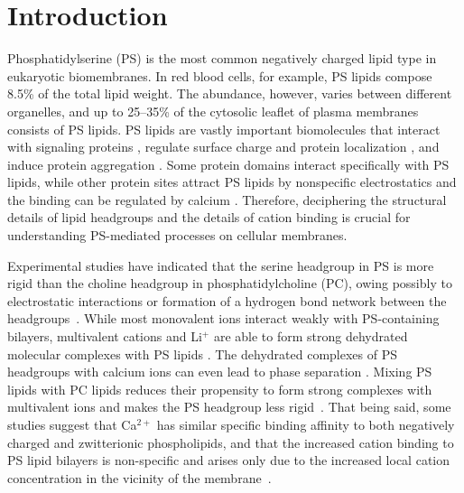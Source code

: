 \documentclass[journal=jpcbfk,manuscript=article]{achemso}
\begin{document}

\maketitle %

\section{Introduction}
Phosphatidylserine (PS) is the most common negatively
charged lipid type in eukaryotic biomembranes. In red blood cells, for example,
PS lipids compose 8.5\% of the total lipid weight. 
The abundance, however, varies between different organelles, and up to
25--35\% of the cytosolic leaflet of plasma membranes 
\cite{lemmon08,leventis10,li14} consists of PS lipids.
PS lipids are vastly important biomolecules that interact with
signaling proteins \cite{leventis10}, regulate
surface charge and protein localization \cite{yeung08}, and
induce protein aggregation \cite{zhao04,gorbenko06}.
Some protein domains interact specifically with PS lipids,
while other protein sites attract PS lipids by nonspecific electrostatics and the
binding can be regulated by calcium \cite{leventis10}.
Therefore, deciphering the structural details
of lipid headgroups and the details of cation binding
is crucial for understanding PS-mediated processes on cellular membranes.

Experimental studies have indicated that the
serine headgroup in PS is more rigid than the choline headgroup in phosphatidylcholine (PC),
owing possibly to electrostatic interactions or formation of a hydrogen bond network between the headgroups~\cite{browning80,buldt81}.
While most monovalent ions interact weakly with
PS-containing bilayers, multivalent cations and Li$^+$ are able to form strong
dehydrated molecular complexes with PS lipids \cite{hauser77,kurland79,eisenberg79,hauser83,dluhy83,hauser85,feigenson86,mattai89,roux90,roux91,boettcher11}.
The dehydrated complexes of PS headgroups with calcium ions can even lead to
phase separation \cite{hauser77,kurland79,hauser85,feigenson86,mattai89,roux90,roux91}. Mixing PS lipids with PC lipids reduces their propensity to form strong complexes with multivalent ions and makes the PS headgroup less rigid~\cite{browning80,buldt81,roux90,roux91}.
That being said, some studies suggest that Ca$^{2+}$ has similar specific binding affinity 
to both negatively charged and zwitterionic phospholipids, and that
the increased cation binding to PS lipid bilayers is non-specific and arises only due to the increased local cation concentration in the vicinity of the membrane~\cite{seelig90,sinn06}. 
\end{document}
